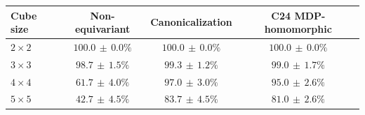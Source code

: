 \begin{table}[t]
  \centering
  \small
  \setlength{\tabcolsep}{5pt}
  \begin{tabular}{lccc}
    \toprule
    Cube size & Non-equivariant & Canonicalization & C24 MDP-homomorphic \\
    \midrule
    $2\times2$ & $100.0\,\pm\,0.0\%$ & $100.0\,\pm\,0.0\%$ & $100.0\,\pm\,0.0\%$ \\
    $3\times3$ & $98.7\,\pm\,1.5\%$ & $99.3\,\pm\,1.2\%$ & $99.0\,\pm\,1.7\%$ \\
    $4\times4$ & $61.7\,\pm\,4.0\%$ & $97.0\,\pm\,3.0\%$ & $95.0\,\pm\,2.6\%$ \\
    $5\times5$ & $42.7\,\pm\,4.5\%$ & $83.7\,\pm\,4.5\%$ & $81.0\,\pm\,2.6\%$ \\
    \bottomrule
  \end{tabular}
\end{table}
